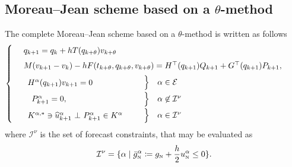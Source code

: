 \subsection{Moreau--Jean scheme based on a  $\theta$-method}
The complete Moreau--Jean scheme based on a  $\theta$-method is written as follows
 \begin{equation}
    \label{eq:Moreau--Jean-theta}
    \begin{cases}
      ~~\begin{array}{l}
        q_{k+1} = q_{k} + h T(q_{k+\theta}) v_{k+\theta} \quad \\[1ex]
        M(v_{k+1}-v_k) - h  F(t_{k+\theta}, q_{k+\theta},v_{k+\theta}) =  H^\top(q_{k+1}) Q_{k+1} + G^\top(q_{k+1}) P_{k+1},\quad\,\\[1ex]
      \end{array}\\
      ~~\begin{array}{lcl}
        \begin{array}{l}
          H^\alpha(q_{k+1}) v_{k+1}  =  0\\
        \end{array} & \left. \begin{array}{l}
          \vphantom{H^\alpha(q_{k+1}) v_{k+1}  =  0}\\[1ex]
        \end{array}\right\}    &\alpha \in \mathcal E  \\[1ex]
      ~~~P_{k+1}^\alpha= 0, &
      \left. \begin{array}{l}
          \vphantom{P_{k+1}^\alpha= 0,  \delta^\alpha_{k+1}=0}\\[1ex]
        \end{array}\right\}   & \alpha \not\in \mathcal I^\nu \\[1ex]
      \begin{array}{l}
          {K}^{\alpha,*} \ni \widehat u_{k+1}^\alpha~ \bot~ P_{k+1}^\alpha \in {K}^\alpha \\
      \end{array} &
      \left.\begin{array}{l}
          \vphantom{{K}^{\alpha,*} \ni \widehat u_{k+1}^\alpha~ \bot~ P_{k+1}^\alpha \in {K}^\alpha} \\
        \end{array}\right\}
      &\alpha \in \mathcal I^\nu\\
  \end{array}
\end{cases}
\end{equation}
where $\mathcal I^\nu$ is the set of forecast constraints, that may be evaluated as
\begin{equation}
  \label{eq:101}
  \mathcal I^\nu = \{\alpha \mid \bar g_{\hbox{\tiny{N}}}^\alpha \coloneqq g_{\hbox{\tiny{N}}} + \frac h 2 u^\alpha_{\hbox{\tiny{N}}} \leq 0\}.
\end{equation}


